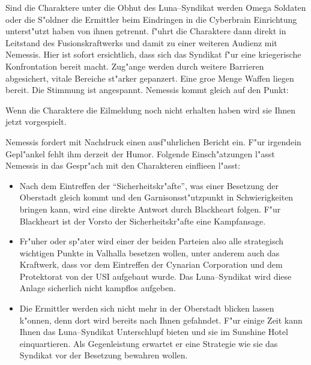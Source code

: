 Sind die Charaktere unter die Obhut des Luna--Syndikat werden Omega Soldaten oder die S"oldner die Ermittler beim Eindringen in die Cyberbrain Einrichtung unterst"utzt haben von ihnen getrennt. \xl{} f"uhrt die Charaktere dann direkt in Leitstand des Fusionskraftwerks und damit zu einer weiteren Audienz mit Nemessis. Hier ist sofort ersichtlich, dass sich das Syndikat f"ur eine kriegerische Konfrontation bereit macht. Zug"ange werden durch weitere Barrieren abgesichert, vitale Bereiche st"arker gepanzert. Eine gro\3e Menge Waffen liegen bereit. Die Stimmung ist angespannt. Nemessis kommt gleich auf den Punkt: 


Wenn die Charaktere die Eilmeldung noch nicht erhalten haben wird sie Ihnen jetzt vorgespielt.


Nemessis fordert mit Nachdruck einen ausf"uhrlichen Bericht ein. F"ur irgendein Gepl"ankel fehlt ihm derzeit der Humor. Folgende Einsch"atzungen l"asst Nemessis in das Gespr"ach mit den Charakteren einflie\3en l"asst:

\begin{itemize}
	\item Nach dem Eintreffen der "`Sicherheitskr"afte"', was einer Besetzung der Oberstadt gleich kommt und den 			
		Garnisonsst"utzpunkt in Schwierigkeiten bringen kann, wird eine direkte Antwort durch Blackheart folgen. F"ur Blackheart ist der Vorsto\3 der Sicherheitskr"afte eine Kampfansage.
	\item Fr"uher oder sp"ater wird einer der beiden Parteien also alle strategisch wichtigen Punkte in Valhalla besetzen wollen, unter 	
		anderem auch das Kraftwerk, dass vor dem Eintreffen der Cynarian Corporation und dem Protektorat von der USI aufgebaut wurde. Das Luna--Syndikat wird diese Anlage sicherlich nicht kampflos aufgeben.
		\item Die Ermittler werden sich nicht mehr in der Oberstadt blicken lassen k"onnen, denn dort wird bereits nach Ihnen gefahndet. F"ur 
		einige Zeit kann Ihnen das Luna--Syndikat Unterschlupf bieten und sie im Sunshine Hotel einquartieren. Als Gegenleistung erwartet er eine Strategie wie sie das Syndikat vor der Besetzung bewahren wollen.			
\end{itemize}

